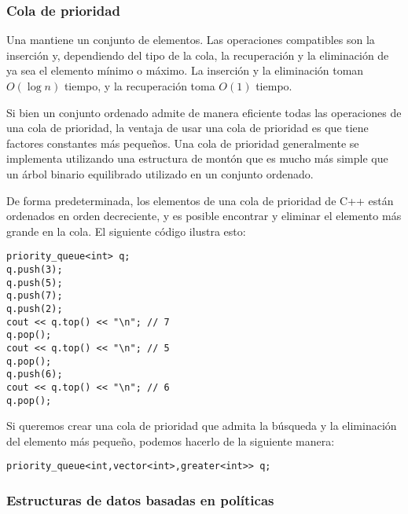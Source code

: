 \subsubsection{Cola de prioridad}


Una 
mantiene un conjunto de elementos.
Las operaciones compatibles son la inserción y,
dependiendo del tipo de la cola,
la recuperación y la eliminación de
ya sea el elemento mínimo o máximo.
La inserción y la eliminación toman $O(\log n)$ tiempo,
y la recuperación toma $O(1)$ tiempo.

Si bien un conjunto ordenado admite de manera eficiente
todas las operaciones de una cola de prioridad,
la ventaja de usar una cola de prioridad es
que tiene factores constantes más pequeños.
Una cola de prioridad generalmente se implementa utilizando
una estructura de montón que es mucho más simple que un
árbol binario equilibrado utilizado en un conjunto ordenado.

\begin{samepage}
De forma predeterminada, los elementos de una cola de prioridad de C++
están ordenados en orden decreciente,
y es posible encontrar y eliminar el
elemento más grande en la cola.
El siguiente código ilustra esto:

\begin{lstlisting}
priority_queue<int> q;
q.push(3);
q.push(5);
q.push(7);
q.push(2);
cout << q.top() << "\n"; // 7
q.pop();
cout << q.top() << "\n"; // 5
q.pop();
q.push(6);
cout << q.top() << "\n"; // 6
q.pop();
\end{lstlisting}
\end{samepage}

Si queremos crear una cola de prioridad
que admita la búsqueda y la eliminación
del elemento más pequeño,
podemos hacerlo de la siguiente manera:

\begin{lstlisting}
priority_queue<int,vector<int>,greater<int>> q;
\end{lstlisting}

\subsubsection{Estructuras de datos basadas en políticas}

